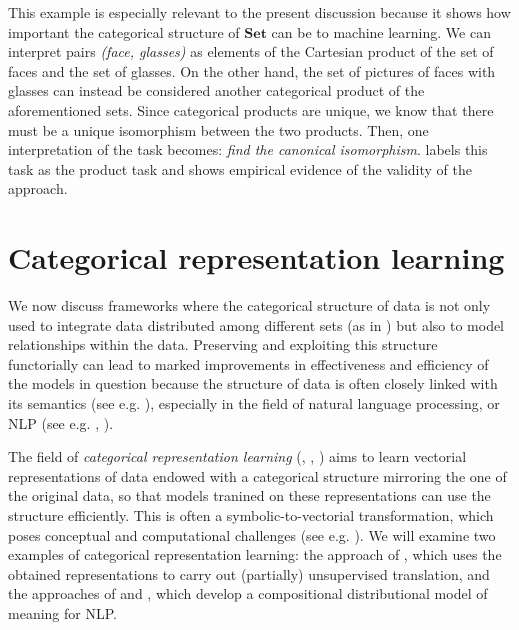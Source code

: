 \documentclass[11pt,a4paper,openright,twoside]{report}
\theoremstyle{plain}
\theoremstyle{definition}
\begin{document}
This example is especially relevant to the present discussion because it shows how important the categorical structure of $\mathbf{Set}$ can be to machine learning. We can interpret pairs \textit{(face, glasses)} as elements of the Cartesian product of the set of faces and the set of glasses. On the other hand, the set of pictures of faces with glasses can instead be considered another categorical product of the aforementioned sets. Since categorical products are unique, we know that there must be a unique isomorphism between the two products. Then, one interpretation of the task becomes: \textit{find the canonical isomorphism}. \cite{gavranovic2019compositional} labels this task as the product task and shows empirical evidence of the validity of the approach.





\section{Categorical representation learning}



We now discuss frameworks where the categorical structure of data is not only used to integrate data distributed among different sets (as in \cite{gavranovic2019compositional}) but also to model relationships within the data. Preserving and exploiting this structure functorially can lead to marked improvements in effectiveness and efficiency of the models in question  because the structure of data is often closely linked with its semantics (see e.g. \cite{sheshmani2021categorical}), especially in the field of natural language processing, or NLP (see e.g. \cite{coecke2010mathematical}, \cite{lewis2019compositionality}). 


The field of \textit{categorical representation learning} (\cite{coecke2010mathematical}, \cite{lewis2019compositionality}, \cite{sheshmani2021categorical}) aims to learn vectorial representations of data endowed with a categorical structure mirroring the one of the original data, so that models tranined on these representations can use the structure efficiently. This is often a symbolic-to-vectorial transformation, which poses conceptual and computational challenges (see e.g. \cite{coecke2010mathematical}). We will examine two examples of categorical representation learning: the approach of \cite{sheshmani2021categorical}, which uses the obtained representations to carry out (partially) unsupervised translation, and the approaches of \cite{coecke2010mathematical} and \cite{lewis2019compositionality}, which develop a compositional distributional model of meaning for NLP.
\end{document}

